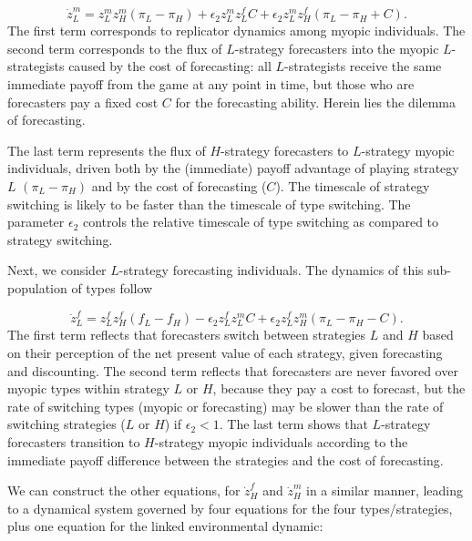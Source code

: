 \documentclass{article}
\begin{document}
\begin{equation}
    \dot{z}_L^m = z_L^m z_H^m \left(\pi_L-\pi_H\right) + \epsilon_2 z_L^m z_L^f C + \epsilon_2 z_L^m z_H^f \left(\pi_L-\pi_H+C\right).
\end{equation}
The first term corresponds to replicator dynamics among myopic individuals. The second term corresponds to the flux of $L$-strategy forecasters into the myopic $L$-strategists caused by the cost of forecasting: all $L$-strategists receive the same immediate payoff from the game at any point in time, but those who are forecasters pay a fixed cost $C$ for the forecasting ability. Herein lies the dilemma of forecasting. 

The last term represents the flux  of $H$-strategy forecasters to $L$-strategy myopic individuals, driven both by the (immediate) payoff advantage of playing strategy $L$ $\left(\pi_L-\pi_H\right)$ and by the cost of forecasting ($C$). The timescale of strategy switching is likely to be faster than the timescale of type switching. The parameter $\epsilon_2$ controls the relative timescale of type switching as compared to strategy switching.

Next, we consider $L$-strategy forecasting individuals. The dynamics of this sub-population of types follow

\begin{equation}
  \dot{z}_L^f =  z_L^f z_H^f (f_L-f_H) - \epsilon_2 z_L^f z_L^m C + \epsilon_2 z_L^f z_H^m \left(\pi_L-\pi_H-C\right).
\end{equation}
The first term reflects that forecasters switch between strategies $L$ and $H$ based on their perception of the net present value of each strategy, given forecasting and discounting. The second term reflects that forecasters are never favored over myopic types within strategy $L$ or $H$, because they pay a cost to forecast, but the rate of switching types (myopic or forecasting) may be slower than the rate of switching strategies ($L$ or $H$) if $\epsilon_2<1$. The last term shows that $L$-strategy forecasters transition to $H$-strategy myopic individuals according to the immediate payoff difference between the strategies and the cost of forecasting.

We can construct the other equations, for $\dot{z}_H^f$ and $\dot{z}_H^m$ in a similar manner, leading to a dynamical system governed by four equations for the four types/strategies, plus one equation for the linked environmental dynamic: 
\end{document}
